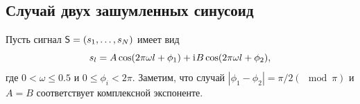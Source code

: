 \documentclass[specialist,
               substylefile = spbu.rtx,
               subf,href,colorlinks=true, 12pt]{disser}
\begin{document}
%
%
%
%
%
%

\subsection{Случай двух зашумленных синусоид}
Пусть сигнал $\textsf{S} = (s_1, \ldots, s_N)$ имеет вид
\begin{equation}
	\label{eq:general_ts}
	s_l = A\cos(2 \pi\omega l + \phi_1) + \mathrm{i}\mkern1mu B\cos(2 \pi\omega l + \phi_2),
\end{equation}
где $0<\omega\le 0.5$ и $0\le\phi_i < 2\pi$.
Заметим, что случай $|\phi_1-\phi_2| = \pi/2 (\mod \pi)$ и $A=B$ соответствует комплексной экспоненте.
\end{document}
